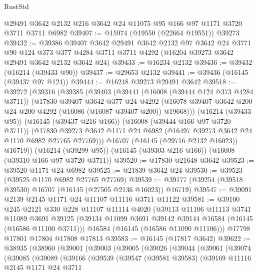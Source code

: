 \begin{lexlean}{RustStd}
\begin{coremodule}
    @29491
    @3642
    @2132
    @216
    @3642
    @24
    @11075
    @95
    @166
    @97
    @1171
    @3720
    @3711
    @3711
    @6982
@39407 := @15974 (@19550 (@22664 @19551)) @39273
@39432 := @39386
    @39407
    @3642
    @29491
    @3642
    @2132
    @97
    @3642
    @24
    @3771
    @90
    @124
    @373
    @377
    @4284
    @3711
    @3711
    @4292
    (@16204 @39273 @3642 @29491 @3642 @2132 @3642 @24)
@39433 := @16234 @2132
@39436 := @39432 (@16214 (@39433 @90))
@39437 := @29653 @2132
@39441 := @39436 (@16145 (@39437 @97 @124))
@39444 := @16248 @39273 @29491 @3642
@39518 := @39272
    (@39316
      (@39385
        (@39403
          (@39441
            (@16008 (@39444 @124 @373 @4284 @3711))
            (@17830
              @39407
              @3642
              @377
              @24
              @4292
              (@16078 @39407 @3642 @200 @24 @200 @4292 (@16086 (@16087 @39407 @200)) @19668)))
          (@16214 (@39433 @95))
          (@16145 (@39437 @216 @166))
          (@16008 (@39444 @166 @97 @3720 @3711))
          (@17830 @39273 @3642 @1171 @24 @6982 (@16497 @39273 @3642 @24 @1170 @6982 @27765 @27769)))
        @16707
        (@16145 (@29716 @2132 @16023))
        @16719))
    (@16214 (@39299 @95))
    (@16145 (@39303 @216 @166))
    (@16008 (@39310 @166 @97 @3720 @3711))
@39520 := @17830 @21648 @3642
@39523 := @39520 @1171 @24 @6982
@39525 := @21839 @3642 @24
@39530 := @39523 (@39525 @1170 @6982 @27765 @27769)
@39539 := @39177 (@39254 (@39518 @39530) @16707 (@16145 (@27505 @2136 @16023)) @16719)
@39547 := @39091 @2139 @2145 @1171 @24 @11107 @11116 @3711 @11122
@39581 := @39100
    @245
    @2121
    @330
    @228
    @11107
    @11114
    @4020
    (@39113
      @11106
      @11113
      @3741
      @11089
      @3691
      @39125
      (@39134 @11099 @3691 @39142 @39144 @16584 (@16145 (@16586 @11100 @3711)))
      @16584
      (@16145 (@16586 @11090 @11106)))
    @17798
    @17801
    @17804
    @17808
    @17813
@39583 := @16145 (@17817 @3642)
@39622 := @38935
    (@38960
      (@39001
        (@39003
          (@39005
            (@39026
              (@39044
                (@39061
                  (@39074
                    (@39085
                      (@39089
                        (@39166
                          (@39539
                            (@39547
                              (@39581 @39583)
                              (@39169
                                @11116
                                @2145
                                @1171
                                @24
                                @3711

\end{coremodule}
\end{lexlean}
